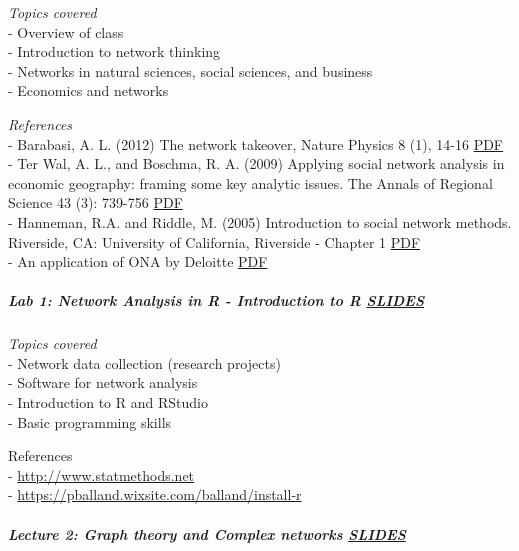 \documentclass[
]{article}
\begin{document}
\emph{Topics covered}\\
- Overview of class\\
- Introduction to network thinking\\
- Networks in natural sciences, social sciences, and business\\
- Economics and networks

\emph{References}\\
- Barabasi, A. L. (2012) The network takeover, Nature Physics 8 (1),
14-16
\href{https://2c2e773f-85c0-4039-818c-ea517fc75085.filesusr.com/ugd/c5611b_c65333e3828c4a7a854f20ff09e4b127.pdf}{PDF}\\
- Ter Wal, A. L., and Boschma, R. A. (2009) Applying social network
analysis in economic geography: framing some key analytic issues. The
Annals of Regional Science 43 (3): 739-756
\href{https://2c2e773f-85c0-4039-818c-ea517fc75085.filesusr.com/ugd/c5611b_0931e6065e214ba1933018110703fae3.pdf}{PDF}\\
- Hanneman, R.A. and Riddle, M. (2005) Introduction to social network
methods. Riverside, CA: University of California, Riverside - Chapter 1
\href{http://faculty.ucr.edu/~hanneman/nettext/C1_Social_Network_Data.html}{PDF}\\
- An application of ONA by Deloitte
\href{https://www2.deloitte.com/us/en/pages/human-capital/articles/organizational-network-analysis.html}{PDF}

\hypertarget{lab-1-network-analysis-in-r---introduction-to-r-slides}{%
\subparagraph{\texorpdfstring{\textbf{Lab 1: Network Analysis in R -
Introduction to R}
\href{https://paballand.github.io/teaching/on/Lab1.html}{SLIDES}}{Lab 1: Network Analysis in R - Introduction to R SLIDES}}\label{lab-1-network-analysis-in-r---introduction-to-r-slides}}

\emph{Topics covered}\\
- Network data collection (research projects)\\
- Software for network analysis\\
- Introduction to R and RStudio\\
- Basic programming skills

References\\
- \url{http://www.statmethods.net}\\
- \url{https://pballand.wixsite.com/balland/install-r}

\hypertarget{lecture-2-graph-theory-and-complex-networks-slides}{%
\subparagraph{\texorpdfstring{\textbf{Lecture 2: Graph theory and
Complex networks}
\href{https://github.com/PABalland/PABalland.github.io/raw/master/teaching/on/L2.pdf}{SLIDES}}{Lecture 2: Graph theory and Complex networks SLIDES}}\label{lecture-2-graph-theory-and-complex-networks-slides}}
\end{document}
